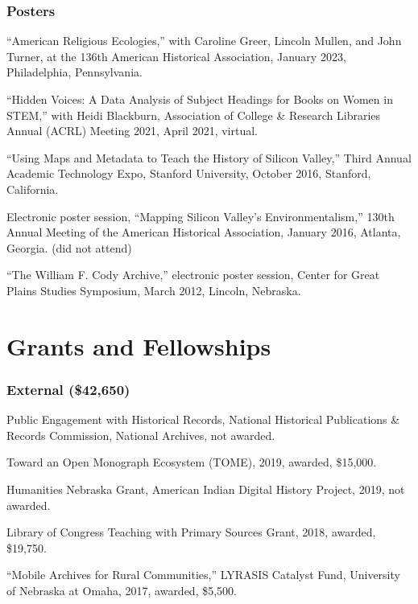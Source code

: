 \hypertarget{posters}{%
\subsubsection{Posters}\label{posters}}

``American Religious Ecologies,'' with Caroline Greer, Lincoln Mullen,
and John Turner, at the 136th American Historical Association, January
2023, Philadelphia, Pennsylvania.

``Hidden Voices: A Data Analysis of Subject Headings for Books on Women
in STEM,'' with Heidi Blackburn, Association of College \& Research
Libraries Annual (ACRL) Meeting 2021, April 2021, virtual.

``Using Maps and Metadata to Teach the History of Silicon Valley,''
Third Annual Academic Technology Expo, Stanford University, October
2016, Stanford, California.

Electronic poster session, ``Mapping Silicon Valley's
Environmentalism,'' 130th Annual Meeting of the American Historical
Association, January 2016, Atlanta, Georgia. (did not attend)

``The William F. Cody Archive,'' electronic poster session, Center for
Great Plains Studies Symposium, March 2012, Lincoln, Nebraska.

\hypertarget{grants-and-fellowships}{%
\section{Grants and Fellowships}\label{grants-and-fellowships}}

\hypertarget{external-42650}{%
\subsubsection{External (\$42,650)}\label{external-42650}}

Public Engagement with Historical Records, National Historical
Publications \& Records Commission, National Archives, not awarded.

Toward an Open Monograph Ecosystem (TOME), 2019, awarded, \$15,000.

Humanities Nebraska Grant, American Indian Digital History Project,
2019, not awarded.

Library of Congress Teaching with Primary Sources Grant, 2018, awarded,
\$19,750.

``Mobile Archives for Rural Communities,'' LYRASIS Catalyst Fund,
University of Nebraska at Omaha, 2017, awarded, \$5,500.

